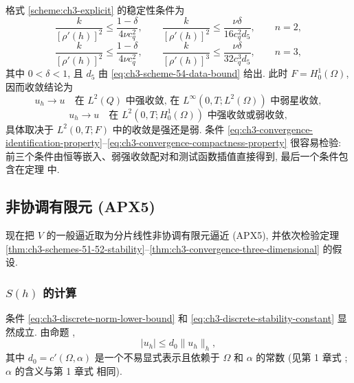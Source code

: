 \hypertarget{chapter-03-page-272}{}
格式 \ref{scheme:ch3-explicit} 的稳定性条件为
\begin{equation}
\frac{k}{[\rho'(h)]^2}\leq\frac{1-\delta}{4\nu c_q^2},
\qquad
\frac{k}{[\rho'(h)]^2}\leq\frac{\nu\delta}{16c_q^2d_5},
\qquad n=2,
\label{eq:ch3-conforming-scheme54-stability-2d}
\end{equation}
\begin{equation}
\frac{k}{[\rho'(h)]^2}\leq\frac{1-\delta}{4\nu c_q^2},
\qquad
\frac{k}{[\rho'(h)]^3}\leq\frac{\nu\delta}{32c_q^3d_5},
\qquad n=3,
\label{eq:ch3-conforming-scheme54-stability-3d}
\end{equation}
其中 $0<\delta<1$, 且 $d_5$ 由 \eqref{eq:ch3-scheme-54-data-bound} 给出. 此时 $F=H_0^1(\Omega)$, 因而收敛结论为
\begin{equation}
u_h\to u\quad\text{在 $L^2(Q)$ 中强收敛, 在 $L^\infty(0,T;L^2(\Omega))$ 中弱星收敛},
\label{eq:ch3-conforming-velocity-convergence-l2}
\end{equation}
\begin{equation}
u_h\to u\quad\text{在 $L^2(0,T;H_0^1(\Omega))$ 中强收敛或弱收敛},
\label{eq:ch3-conforming-velocity-convergence-h1}
\end{equation}
具体取决于 $L^2(0,T;F)$ 中的收敛是强还是弱. 条件 \eqref{eq:ch3-convergence-identification-property}--\eqref{eq:ch3-convergence-compactness-property} 很容易检验: 前三个条件由恒等嵌入、弱强收敛配对和测试函数插值直接得到, 最后一个条件包含在定理  中.

\subsection{非协调有限元 (APX5)}
\label{subsec:ch3-nonconforming-finite-elements}

现在把 $V$ 的一般逼近取为分片线性非协调有限元逼近 (APX5), 并依次检验定理 \ref{thm:ch3-schemes-51-52-stability}--\ref{thm:ch3-convergence-three-dimensional} 的假设.

\subsubsection{$S(h)$ 的计算}
条件 \eqref{eq:ch3-discrete-norm-lower-bound} 和 \eqref{eq:ch3-discrete-stability-constant} 显然成立. 由命题 ,
\begin{equation}
|u_h|\leq d_0\lVert u_h\rVert_h,
\label{eq:ch3-apx5-l2-bound}
\end{equation}
其中 $d_0=c'(\Omega,\alpha)$ 是一个不易显式表示且依赖于 $\Omega$ 和 $\alpha$ 的常数 (见第 1 章式 ; $\alpha$ 的含义与第 1 章式  相同).

